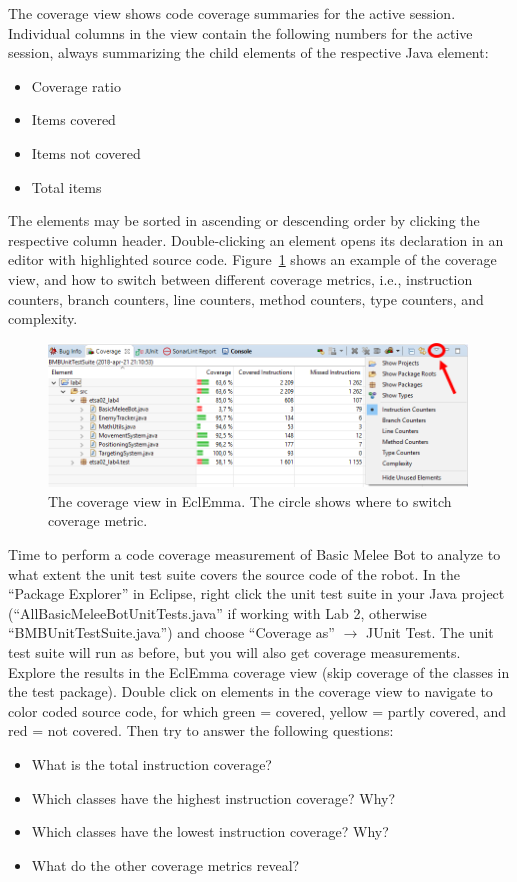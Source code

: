 \documentclass{scrreprt}
\begin{document}
The coverage view shows code coverage summaries for the active session. Individual columns in the view contain the following numbers for the active session, always summarizing the child elements of the respective Java element:

\begin{itemize}
\item Coverage ratio
\item Items covered
\item Items not covered
\item Total items
\end{itemize}

The elements may be sorted in ascending or descending order by clicking the respective column header. Double-clicking an element opens its declaration in an editor with highlighted source code. Figure~\ref{fig:eclemma} shows an example of the coverage view, and how to switch between different coverage metrics, i.e., instruction counters, branch counters, line counters, method counters, type counters, and complexity.  

\begin{figure}
\centering
\includegraphics[width=0.99\textwidth]{figures/EclEmma.png}
\caption{The coverage view in EclEmma. The circle shows where to switch coverage metric.}
\label{fig:eclemma}
\end{figure}

Time to perform a code coverage measurement of Basic Melee Bot to analyze to what extent the unit test suite covers the source code of the robot. In the ``Package Explorer'' in Eclipse, right click the unit test suite in your Java project (``AllBasicMeleeBotUnitTests.java'' if working with Lab 2, otherwise ``BMBUnitTestSuite.java'') and choose ``Coverage as'' $\rightarrow$ JUnit Test. The unit test suite will run as before, but you will also get coverage measurements. Explore the results in the EclEmma coverage view (skip coverage of the classes in the test package). Double click on elements in the coverage view to navigate to color coded source code, for which green = covered, yellow = partly covered, and red = not covered. Then try to answer the following questions:
\begin{itemize}
\item What is the total instruction coverage?
\item Which classes have the highest instruction coverage? Why?
\item Which classes have the lowest instruction coverage? Why?
\item What do the other coverage metrics reveal?   
\end{itemize}
\end{document}
